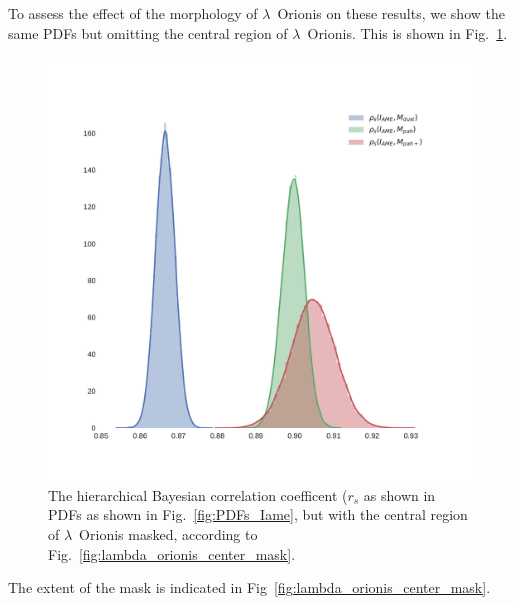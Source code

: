     To assess the effect of the morphology of $\lambda$~Orionis on these results, we show the same PDFs but omitting the central region of $\lambda$~Orionis. This is shown in Fig.~\ref{fig:PDFs_center_masked_Iame}.
         \begin{figure}
          \includegraphics[width=\textwidth]{../Plots/ch_lori/PDFs_center_masked_Iame.pdf}
          \centering
          \caption{ The hierarchical Bayesian correlation coefficent ($r_{s}$ as shown in PDFs as shown in Fig.~\ref{fig:PDFs_Iame}, but with the central region of $\lambda$~Orionis masked, according to Fig.~\ref{fig:lambda_orionis_center_mask}. }
          \label{fig:PDFs_center_masked_Iame}
        \end{figure}
    The extent of the mask is indicated in Fig~\ref{fig:lambda_orionis_center_mask}.
